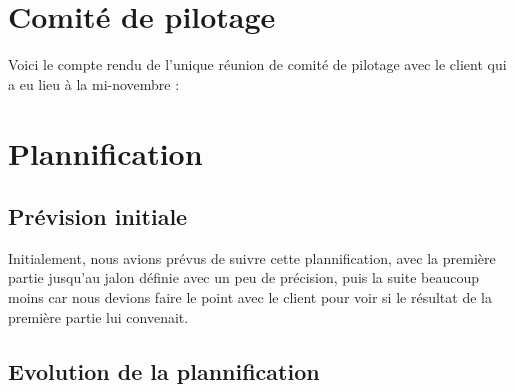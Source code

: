 \documentclass[11pt]{report}
\begin{document}
\section{Comité de pilotage}
Voici le compte rendu de l'unique réunion de comité de pilotage avec le client
qui a eu lieu à la mi-novembre : 
 \begin{landscape}
   
\end{landscape}
\clearpage

\newpage
\section{Plannification}
\subsection{Prévision initiale}
Initialement, nous avions prévus de suivre cette plannification, avec la
première partie jusqu'au jalon définie avec un peu de précision, puis la suite
beaucoup moins car nous devions faire le point avec le client pour voir si le
résultat de la première partie lui convenait.
\par

 \begin{landscape}
   
\end{landscape}
\clearpage

\subsection{Evolution de la plannification}
\end{document}
